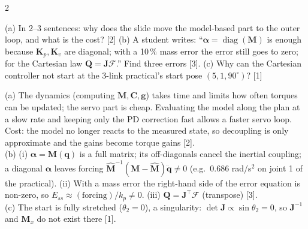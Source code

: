 \begin{multicols}{2}
\begin{examq}
(a) In 2--3 sentences: why does the slide move the model-based part to the outer loop, and what is the cost? [2] (b) A student writes: ``$\boldsymbol\alpha=\operatorname{diag}(\mathbf M)$ is enough because $\mathbf K_p,\mathbf K_v$ are diagonal; with a 10\,\% mass error the error still goes to zero; for the Cartesian law $\mathbf Q=\mathbf J\mathcal F$.'' Find three errors [3]. (c) Why can the Cartesian controller not start at the 3-link practical's start pose $(5,1,90^\circ)$? [1]
\end{examq}
\begin{examq}[EQ6: solution]
\solution
(a) The dynamics (computing $\mathbf M,\mathbf C,\mathbf g$) takes time and limits how often torques can be updated; the servo part is cheap. Evaluating the model along the plan at a slow rate and keeping only the PD correction fast allows a faster servo loop. Cost: the model no longer reacts to the measured state, so decoupling is only approximate and the gains become torque gains [2].\\
(b) (i) $\boldsymbol\alpha=\mathbf M(\mathbf q)$ is a full matrix; its off-diagonals cancel the inertial coupling; a diagonal $\boldsymbol\alpha$ leaves forcing $\hat{\mathbf M}^{-1}(\mathbf M-\hat{\mathbf M})\ddot{\mathbf q}\ne0$ (e.g.\ $0.686$ rad/s$^2$ on joint 1 of the practical). (ii) With a mass error the right-hand side of the error equation is non-zero, so $E_{ss}\approx(\text{forcing})/k_p\ne0$. (iii) $\mathbf Q=\mathbf J^\top\mathcal F$ (transpose) [3].\\
(c) The start is fully stretched ($\theta_2=0$), a singularity: $\det\mathbf J\propto\sin\theta_2=0$, so $\mathbf J^{-1}$ and $\mathbf M_x$ do not exist there [1]. \chk
\end{examq}



\end{multicols}
